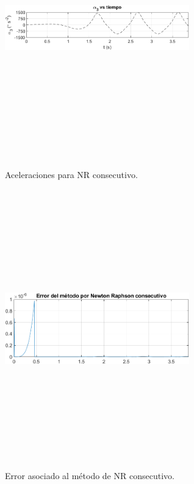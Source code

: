 \documentclass[12pt]{article}
\begin{document}
\begin{multicols}{2}
\begin{figure} [H]
    \end{figure}
        \vspace{-20pt}
        \begin{figure} [H]
        \centerline{\includegraphics[width=8cm, height=12cm,keepaspectratio]{NR Consecutivo/alpha3.png}}
        \caption{Aceleraciones para NR consecutivo.}
        \label{}
    \end{figure}
        \begin{figure} [H]
        \centerline{\includegraphics[width=8cm, height=12cm,keepaspectratio]{Implementacion/error Resultados NR_EX.png}}
        \caption{Error asociado al método de NR consecutivo.}
        \label{ERRORNREX}
    \end{figure}   
\end{multicols} 
\end{document}
